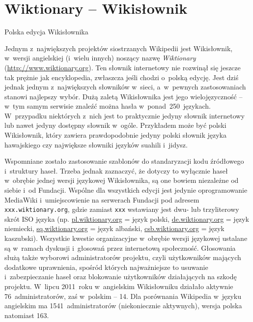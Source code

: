 \documentclass{pracamgr}
\begin{document}
\section{Wiktionary -- Wikisłownik}
\begin{illustration}
	\caption{Polska edycja Wikisłownika}
\end{illustration}
Jednym z~największych projektów siostrzanych Wikipedii jest Wikisłownik, w~wersji angielskiej (i~wielu innych) noszący nazwę \emph{Wiktionary} (\protect\url{http://www.wiktionary.org}). Ten słownik internetowy nie rozwinął się jeszcze tak prężnie jak encyklopedia, zwłaszcza jeśli chodzi o~polską edycję. Jest dziś jednak jednym z~największych słowników w~sieci, a~w~pewnych zastosowaniach stanowi najlepszy wybór. Dużą zaletą Wikisłownika jest jego wielojęzyczność -- w~tym samym serwisie znaleźć można hasła w~ponad~250~językach. W~przypadku niektórych z~nich jest to praktycznie jedyny słownik internetowy lub nawet jedyny dostępny słownik w~ogóle. Przykładem może być polski Wikisłownik, który zawiera prawdopodobnie jedyny polski słownik języka hawajskiego czy największe słowniki języków suahili i~jidysz. %

Wspomniane zostało zastosowanie szablonów do standaryzacji kodu źródłowego i~struktury haseł. Trzeba jednak zaznaczyć, że dotyczy to wyłącznie haseł w~obrębie jednej wersji językowej Wikisłownika, są one bowiem niezależne od siebie i~od Fundacji. Wspólne dla wszystkich edycji jest jedynie oprogramowanie MediaWiki i~umiejscowienie na serwerach Fundacji pod adresem \verb|xxx.wiktionary.org|, gdzie zamiast \verb|xxx| wstawiany jest dwu- lub trzyliterowy skrót ISO języka (np. \protect\url{pl.wiktionary.org} = język polski, \protect\url{de.wiktionary.org} = język niemiecki, \protect\url{sq.wiktionary.org} = język albański, \protect\url{csb.wiktionary.org} = język kaszubski). Wszystkie kwestie organizacyjne w~obrębie wersji językowej ustalane są w~ramach dyskusji i~głosowań przez internetową społeczność. Głosowania służą także wyborowi administratorów projektu, czyli użytkowników mających dodatkowe uprawnienia, spośród których najważniejsze to usuwanie i~zabezpieczanie haseł oraz blokowanie użytkowników działających na szkodę projektu. W~lipcu 2011~roku w~angielskim Wikisłowniku działało aktywnie 76~administratorów, %
zaś w~polskim -- 14. %
Dla porównania Wikipedia w~języku angielskim ma 1541~administratorów (niekoniecznie aktywnych), wersja polska natomiast 163. %
\end{document}
